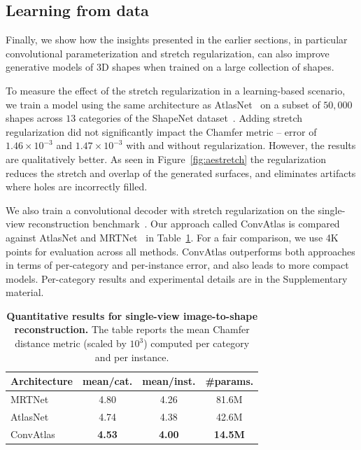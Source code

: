 \subsection{Learning from data}\label{sec:exp_data}
Finally, we show how the insights presented in the earlier sections, in particular convolutional parameterization and stretch regularization, can also improve generative models of 3D shapes when trained on a large collection of shapes. 

To measure the effect of the stretch regularization in a learning-based scenario,
we train a model using the same architecture as AtlasNet~\cite{atlasnet} on a subset of $50,000$ shapes across $13$ categories of the ShapeNet dataset~\cite{chang2015shapenet}.
Adding stretch regularization did not significantly impact the Chamfer metric -- error of $1.46 \times 10^{-3}$ and $1.47 \times 10^{-3}$ with and without regularization.
However, the results are qualitatively better. 
As seen in Figure~\ref{fig:aestretch} the regularization reduces the stretch and overlap of the generated surfaces, and eliminates artifacts where holes are incorrectly filled.

We also train a convolutional decoder with stretch regularization on the single-view reconstruction benchmark~\cite{choy20163d}.
Our approach called ConvAtlas is compared against AtlasNet and MRTNet~\cite{mrt18} in Table~\ref{tab:svr}.
For a fair comparison, we use 4K points for evaluation across all methods.
ConvAtlas outperforms both approaches in terms of per-category and per-instance error, and also leads to more compact models.
Per-category results and experimental details are in the Supplementary material.


\begin{table}[t!]
\tabcolsep=0.11cm
\centering
\small
\begin{tabular}{|l|c|c|c|}
    \hline
    Architecture &  mean/cat. & mean/inst. & \#params. \\
    \hline
    MRTNet & 4.80 & 4.26 & 81.6M\\
    AtlasNet & 4.74 & 4.38 & 42.6M\\
    ConvAtlas & \textbf{4.53} & \textbf{4.00} & \textbf{ 14.5M}\\
    \hline
\end{tabular}
\vspace{4pt}
\caption{\small \textbf{Quantitative results for single-view image-to-shape reconstruction.} The table reports the mean Chamfer distance metric (scaled by $10^3$) computed per category and per instance.
  }
  \label{tab:svr}
  \vspace{-12pt}
\end{table}
